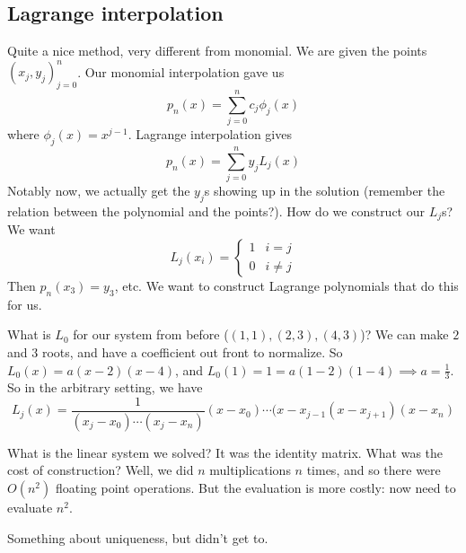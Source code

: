 \documentclass{article}
\theoremstyle{plain}
\theoremstyle{remark}
\begin{document}
\subsection{Lagrange interpolation}
Quite a nice method, very different from monomial.
We are given the points $(x_j,y_j)_{j=0}^n$.
Our monomial interpolation gave us
\[
	p_n(x) = \sum_{j=0}^n c_j \phi_j(x)
\]
where $\phi_j(x) = x^{j-1}$.
Lagrange interpolation gives
\[
	p_n(x) = \sum_{j=0}^n y_j L_j(x)
\]
Notably now, we actually get the $y_j$s showing up in the solution
(remember the relation between the polynomial and the points?).
How do we construct our $L_j$s? We want
\[
	L_j(x_i) = \begin{cases} 1 & i = j \\ 0 & i \neq j \end{cases}
\]
Then $p_n(x_3) = y_3$, etc.
We want to construct Lagrange polynomials that do this for us.

What is $L_0$ for our system from before ($(1,1),(2,3),(4,3)$)?
We can make $2$ and $3$ roots, and have a coefficient out front to normalize.
So $L_0(x) = a(x-2)(x-4)$, and $L_0(1) = 1 = a(1-2)(1-4) \implies a = \frac13$.
So in the arbitrary setting, we have
\[
	L_j(x) = \frac{1}{(x_j - x_0)\cdots(x_j-x_n)}(x-x_0)\cdots (x - x_{j-1}
	(x - x_{j+1})(x-x_n)
\]

What is the linear system we solved?
It was the identity matrix.
What was the cost of construction?
Well, we did $n$ multiplications $n$ times,
and so there were $O(n^2)$ floating point operations.
But the evaluation is more costly: now need to evaluate $n^2$.

Something about uniqueness, but didn't get to.
\end{document}
